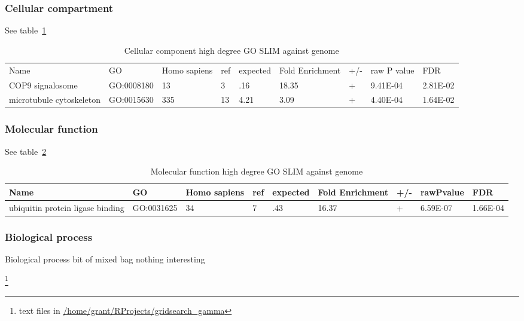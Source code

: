 \subsubsection{Cellular compartment }
See table~\ref{tab:Cellular component high degree GO SLIM against genome}
\begin{table}
\centering
\begin{adjustbox}{max width=\textwidth}
\begin{tabular}{lllllllll}
  Name & GO&	Homo sapiens &ref &	expected &	Fold Enrichment &	+/-	&raw P value&FDR\\
  COP9 signalosome&GO:0008180&	13&	3&	.16&	18.35&	+&	9.41E-04&	2.81E-02\\
  microtubule cytoskeleton &GO:0015630&	335&	13&	4.21&	3.09&	+&	4.40E-04&	1.64E-02\\
\end{tabular}
\end{adjustbox}
\caption{Cellular component high degree GO SLIM against genome}
\label{tab:Cellular component high degree GO SLIM against genome}
\end{table}

\subsubsection{Molecular function}
See table~\ref{tab:Molecular function high degree GO SLIM against genome}
\begin{table}
\centering
\begin{adjustbox}{max width=\textwidth}
\begin{tabular}{lllllllll}
  Name & GO&	Homo sapiens &ref &	expected &	Fold Enrichment &	+/-	&rawPvalue&FDR\\
\hline
ubiquitin protein ligase binding&GO:0031625&	34&	7&	.43&	16.37&	+&	6.59E-07&	1.66E-04\\
\end{tabular}
\end{adjustbox}
\caption{Molecular function high degree GO SLIM against genome}
\label{tab:Molecular function high degree GO SLIM against genome}
\end{table}

\subsubsection{Biological process}
Biological process bit of mixed bag nothing interesting 

\footnote{text files in \url{/home/grant/RProjects/gridsearch_gamma}}

